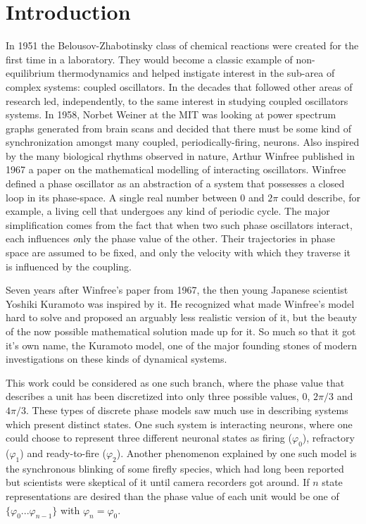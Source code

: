 \chapter{Introduction}

In 1951 the Belousov-Zhabotinsky class of chemical reactions were created for the first time in a laboratory. They would become a
classic example of non-equilibrium thermodynamics and helped instigate interest in the sub-area of complex systems: coupled
oscillators. In the decades that followed other areas of research led, independently, to the same interest in studying coupled
oscillators systems. In 1958, Norbet Weiner at the MIT was looking at power spectrum graphs generated from brain scans and decided that
there must be some kind of synchronization amongst many coupled, periodically-firing, neurons. Also inspired by the many biological
rhythms observed in nature, Arthur Winfree published in 1967 a paper on the mathematical modelling of interacting oscillators. Winfree
defined a phase oscillator as an abstraction of a system that possesses a closed loop in its phase-space. A single real number between
$0$ and $2\pi$ could describe, for example, a living cell that undergoes any kind of periodic cycle. The major simplification comes
from the fact that when two such phase oscillators interact, each influences {\textit only} the phase value of the other. Their
trajectories in phase space are assumed to be fixed, and only the velocity with which they traverse it is influenced by the coupling.

Seven years after Winfree's paper from 1967, the then young Japanese scientist Yoshiki Kuramoto was inspired by it. He recognized what
made Winfree's model hard to solve and proposed an arguably less realistic version of it, but the beauty of the now possible
mathematical solution made up for it. So much so that it got it's own name, the Kuramoto model, one of the major founding stones of
modern investigations on these kinds of dynamical systems.

This work could be considered as one such branch, where the phase value that describes a unit has been discretized into only three
possible values, $0$, $2\pi/3$ and $4\pi/3$. These types of discrete phase models saw much use in describing systems which present
distinct states. One such system is interacting neurons, where one could choose to represent three different neuronal states as firing
($\varphi_0$), refractory ($\varphi_1$) and ready-to-fire ($\varphi_2$). Another phenomenon explained by one such model is the
synchronous blinking of some firefly species, which had long been reported but scientists were skeptical of it until camera recorders
got around. If $n$ state representations are desired than the phase value of each unit would be one of $\{\varphi_0 ...
\varphi_{n-1}\}$ with $\varphi_{n}=\varphi_0$.


